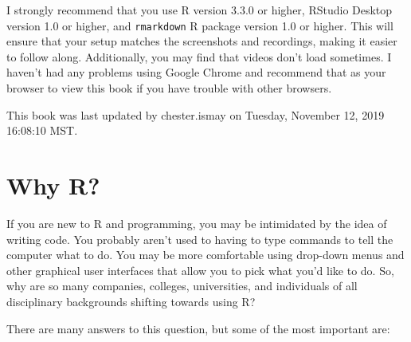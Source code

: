 \documentclass[]{tufte-book}
\begin{document}
I strongly recommend that you use R version 3.3.0 or higher, RStudio Desktop version 1.0 or higher, and \texttt{rmarkdown} R package version 1.0 or higher. This will ensure that your setup matches the screenshots and recordings, making it easier to follow along. Additionally, you may find that videos don't load sometimes. I haven't had any problems using Google Chrome and recommend that as your browser to view this book if you have trouble with other browsers.

This book was last updated by chester.ismay on Tuesday, November 12, 2019 16:08:10 MST.

\hypertarget{whyR}{%
\chapter{Why R?}\label{whyR}}

If you are new to R and programming, you may be intimidated by the idea of writing code. You probably aren't used to having to type commands to tell the computer what to do. You may be more comfortable using drop-down menus and other graphical user interfaces that allow you to pick what you'd like to do. So, why are so many companies, colleges, universities, and individuals of all disciplinary backgrounds shifting towards using R?

There are many answers to this question, but some of the most important are:
\end{document}
